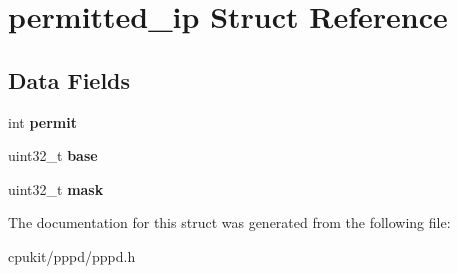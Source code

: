 \hypertarget{structpermitted__ip}{}\section{permitted\+\_\+ip Struct Reference}
\label{structpermitted__ip}
\subsection*{Data Fields}
\begin{DoxyCompactItemize}
\item 
\mbox{\label{structpermitted__ip_ac073059babca8b28bde5dce27d317c47}} 
int {\bfseries permit}
\item 
\mbox{\label{structpermitted__ip_a1f7004e4278d935193344403ad63aa8f}} 
uint32\+\_\+t {\bfseries base}
\item 
\mbox{\label{structpermitted__ip_a4c6b8856e40452f54c9bb9cf21302b30}} 
uint32\+\_\+t {\bfseries mask}
\end{DoxyCompactItemize}


The documentation for this struct was generated from the following file\+:\begin{DoxyCompactItemize}
\item 
cpukit/pppd/pppd.\+h\end{DoxyCompactItemize}
